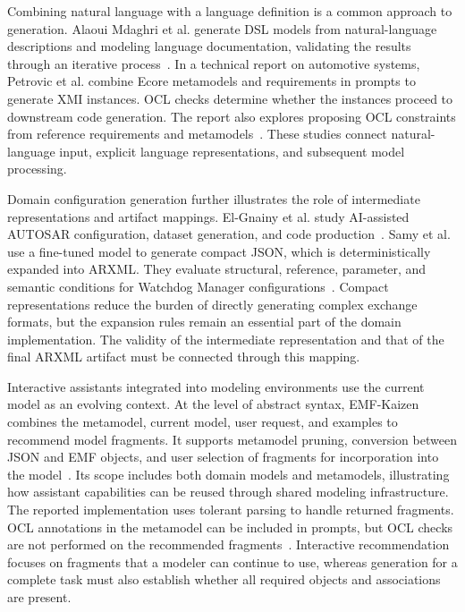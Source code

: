 \documentclass[pdflatex,iicol,sn-mathphys-num]{sn-jnl}
\newcommand{\paperref}[1]{~\citep{#1}}
\begin{document}
Combining natural language with a language definition is a common approach to generation. Alaoui Mdaghri et al. generate DSL models from natural-language descriptions and modeling language documentation, validating the results through an iterative process\paperref{10.1007/978-3-031-85356-2_8}. In a technical report on automotive systems, Petrovic et al. combine Ecore metamodels and requirements in prompts to generate XMI instances. OCL checks determine whether the instances proceed to downstream code generation. The report also explores proposing OCL constraints from reference requirements and metamodels\paperref{https://doi.org/10.48550/arxiv.2404.05508}. These studies connect natural-language input, explicit language representations, and subsequent model processing.

Domain configuration generation further illustrates the role of intermediate representations and artifact mappings. El-Gnainy et al. study AI-assisted AUTOSAR configuration, dataset generation, and code production\paperref{El_Gnainy_2024}. Samy et al. use a fine-tuned model to generate compact JSON, which is deterministically expanded into ARXML. They evaluate structural, reference, parameter, and semantic conditions for Watchdog Manager configurations\paperref{Samy_2026}. Compact representations reduce the burden of directly generating complex exchange formats, but the expansion rules remain an essential part of the domain implementation. The validity of the intermediate representation and that of the final ARXML artifact must be connected through this mapping.

Interactive assistants integrated into modeling environments use the current model as an evolving context. At the level of abstract syntax, EMF-Kaizen combines the metamodel, current model, user request, and examples to recommend model fragments. It supports metamodel pruning, conversion between JSON and EMF objects, and user selection of fragments for incorporation into the model\paperref{JOT:issue_2026_03/a8}. Its scope includes both domain models and metamodels, illustrating how assistant capabilities can be reused through shared modeling infrastructure. The reported implementation uses tolerant parsing to handle returned fragments. OCL annotations in the metamodel can be included in prompts, but OCL checks are not performed on the recommended fragments\paperref{JOT:issue_2026_03/a8}. Interactive recommendation focuses on fragments that a modeler can continue to use, whereas generation for a complete task must also establish whether all required objects and associations are present.
\end{document}
